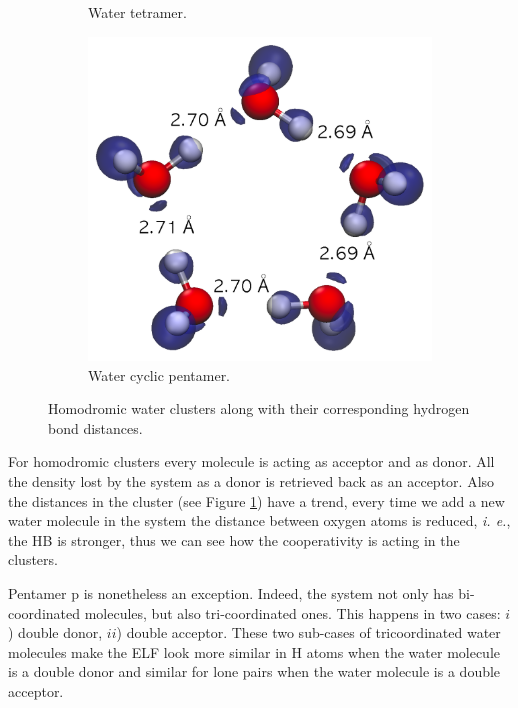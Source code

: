 \begin{figure}[h]
\begin{subfigure}[b]{0.32\linewidth}
\caption{Water tetramer.}
\end{subfigure}
\begin{subfigure}[b]{0.32\linewidth}
\includegraphics[width=\linewidth]{4/plots/elf/new/pentamer_cELF}
\caption{Water cyclic pentamer.}
\end{subfigure}
\caption{Homodromic water clusters along with their corresponding hydrogen bond distances.}
\label{homodromic}
\end{figure}

For homodromic clusters every molecule is acting as acceptor and as donor.
All the
density lost by the system as a donor is retrieved back as an acceptor. Also
the distances in the cluster (see Figure \ref{homodromic}) have a trend, every time we add a new water
molecule in the system the distance between oxygen atoms is reduced,
\textit{i. e.}, the HB is stronger, thus we can see how the cooperativity is
acting in the clusters.

\newpage

Pentamer p is nonetheless an exception. Indeed, the system not only has
bi-coordinated molecules, but also tri-coordinated ones. This happens
in two cases:
$i$) double donor, $ii$) double acceptor.
These two sub-cases of tricoordinated water molecules make the ELF look more
similar in H atoms when the water molecule is a double donor and similar for
lone pairs when the water molecule is a double acceptor.

